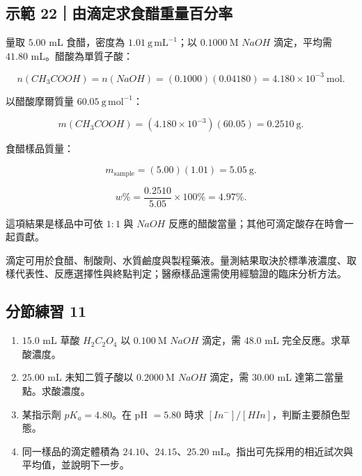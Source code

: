 \documentclass[11pt,a4paper]{article}
\providecommand{\tightlist}{%
  \setlength{\itemsep}{0pt}\setlength{\parskip}{0pt}}
\begin{document}
\begin{HandoutWorkedExample}

\subsection{示範 22｜由滴定求食醋重量百分率}\label{ux793aux7bc4-22ux7531ux6ef4ux5b9aux6c42ux98dfux918bux91cdux91cfux767eux5206ux7387}

量取 \(5.00\) mL 食醋，密度為 \(1.01\ \mathrm{g\,mL^{-1}}\)；以 \(0.1000\ \mathrm M\) \(NaOH\) 滴定，平均需 \(41.80\) mL。醋酸為單質子酸：

\[
n(CH_3COOH)=n(NaOH)
=(0.1000)(0.04180)
=4.180\times10^{-3}\ \mathrm{mol}.
\]

以醋酸摩爾質量 \(60.05\ \mathrm{g\,mol^{-1}}\)：

\[
m(CH_3COOH)=(4.180\times10^{-3})(60.05)
=0.2510\ \mathrm g.
\]

食醋樣品質量：

\[
m_{\mathrm{sample}}=(5.00)(1.01)=5.05\ \mathrm g.
\]

\[
w\%=\frac{0.2510}{5.05}\times100\%=4.97\%.
\]

這項結果是樣品中可依 \(1:1\) 與 \(NaOH\) 反應的醋酸當量；其他可滴定酸存在時會一起貢獻。

\end{HandoutWorkedExample}

滴定可用於食醋、制酸劑、水質鹼度與製程藥液。量測結果取決於標準液濃度、取樣代表性、反應選擇性與終點判定；醫療樣品還需使用經驗證的臨床分析方法。

\subsection{分節練習 11}\label{ux5206ux7bc0ux7df4ux7fd2-11}

\begin{enumerate}
\def\labelenumi{\arabic{enumi}.}
\tightlist
\item
  \(15.0\) mL 草酸 \(H_2C_2O_4\) 以 \(0.100\ \mathrm M\) \(NaOH\) 滴定，需 \(48.0\) mL 完全反應。求草酸濃度。
\item
  \(25.00\) mL 未知二質子酸以 \(0.2000\ \mathrm M\) \(NaOH\) 滴定，需 \(30.00\) mL 達第二當量點。求酸濃度。
\item
  某指示劑 \(pK_a=4.80\)。在 pH \(=5.80\) 時求 \([In^-]/[HIn]\)，判斷主要顏色型態。
\item
  同一樣品的滴定體積為 \(24.10\)、\(24.15\)、\(25.20\) mL。指出可先採用的相近試次與平均值，並說明下一步。
\end{enumerate}
\end{document}
